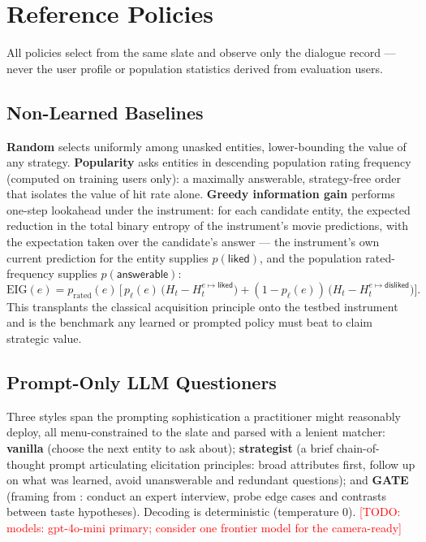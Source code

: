 \documentclass[11pt]{article}
\newcommand{\todo}[1]{\textcolor{red}{[TODO: #1]}}
\begin{document}
\section{Reference Policies}
\label{sec:policies}

All policies select from the same slate and observe only the dialogue
record --- never the user profile or population statistics derived from
evaluation users.

\subsection{Non-Learned Baselines}

\textbf{Random} selects uniformly among unasked entities, lower-bounding
the value of any strategy. \textbf{Popularity} asks entities in descending
population rating frequency (computed on training users only): a maximally
answerable, strategy-free order that isolates the value of hit rate alone.
\textbf{Greedy information gain} performs one-step lookahead under the
instrument: for each candidate entity, the expected reduction in the total
binary entropy of the instrument's movie predictions, with the expectation
taken over the candidate's answer --- the instrument's own current
prediction for the entity supplies $p(\textsf{liked})$, and the
population rated-frequency supplies $p(\textsf{answerable})$:
\begin{equation}
\mathrm{EIG}(e) = p_{\mathrm{rated}}(e)\,\Big[\, p_\ell(e)\,
\big(H_t - H_t^{e \mapsto \textsf{liked}}\big) + (1 - p_\ell(e))\,
\big(H_t - H_t^{e \mapsto \textsf{disliked}}\big) \Big].
\end{equation}
This transplants the classical acquisition principle
\citep{viappiani2009regret, christakopoulou2016towards} onto the testbed
instrument and is the benchmark any learned or prompted policy must beat to
claim strategic value.

\subsection{Prompt-Only LLM Questioners}

Three styles span the prompting sophistication a practitioner might
reasonably deploy, all menu-constrained to the slate and parsed with a
lenient matcher: \textbf{vanilla} (choose the next entity to ask about);
\textbf{strategist} (a brief chain-of-thought prompt articulating
elicitation principles: broad attributes first, follow up on what was
learned, avoid unanswerable and redundant questions); and \textbf{GATE}
(framing from \citet{li2023eliciting}: conduct an expert interview, probe
edge cases and contrasts between taste hypotheses). Decoding is
deterministic (temperature 0). \todo{models: gpt-4o-mini primary; consider
one frontier model for the camera-ready}
\end{document}
